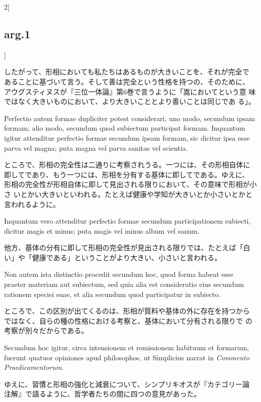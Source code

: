 \documentclass[paper=a4paper,fontsize=10pt,jafontsize=9pt,titlepage]{jlreq}
\begin{document}
\begin{paracol}{2}[\subsection{arg.1}]
\switchcolumn

したがって、形相においても私たちはあるものが大きいことを、それが完全で
あることに基づいて言う。そして善は完全という性格を持つの、そのために、
アウグスティヌスが『三位一体論』第6巻で言うように「嵩においてという意
味ではなく大きいものにおいて、より大きいこととより善いことは同じであ
る」。

\switchcolumn*

Perfectio autem formae dupliciter potest considerari, uno modo,
secundum ipsam formam; alio modo, secundum quod subiectum participat
formam. 
Inquantum igitur attenditur perfectio formae secundum ipsam
formam, sic dicitur ipsa esse parva vel magna; puta magna vel parva
sanitas vel scientia.

\switchcolumn

ところで、形相の完全性は二通りに考察されうる。一つには、その形相自体に
即してであり、もう一つには、形相を分有する基体に即してである。ゆえに、
 形相の完全性が形相自体に即して見出される限りにおいて、その意味で形相が小さ
 いとかい大きいといわれる。たとえば健康や学知が大きいとか小さいとかと
 言われるように。

\switchcolumn*

Inquantum vero attenditur perfectio formae
secundum participationem subiecti, dicitur magis et minus; puta magis
vel minus album vel sanum.

\switchcolumn

他方、基体の分有に即して形相の完全性が見出される限りでは、たとえば「白
 い」や「健康である」ということがより大きい、小さいと言われる。

\switchcolumn*

Non autem ista distinctio procedit secundum
hoc, quod forma habeat esse praeter materiam aut subiectum, sed quia
alia est consideratio eius secundum rationem speciei suae, et alia
secundum quod participatur in subiecto.

\switchcolumn

ところで、この区別が出てくるのは、形相が質料や基体の外に存在を持つから
 ではなく、自らの種の性格における考察と、基体において分有される限りで
 の考察が別々だからである。

\switchcolumn*

Secundum hoc igitur, circa
intensionem et remissionem habituum et formarum, fuerunt quatuor
opiniones apud philosophos, ut Simplicius narrat in {\itshape Commento
Praedicamentorum}.

\switchcolumn

ゆえに、習慣と形相の強化と減衰について、シンプリキオスが『カテゴリー論
 注解』で語るように、哲学者たちの間に四つの意見があった。


\end{paracol}
\end{document}
